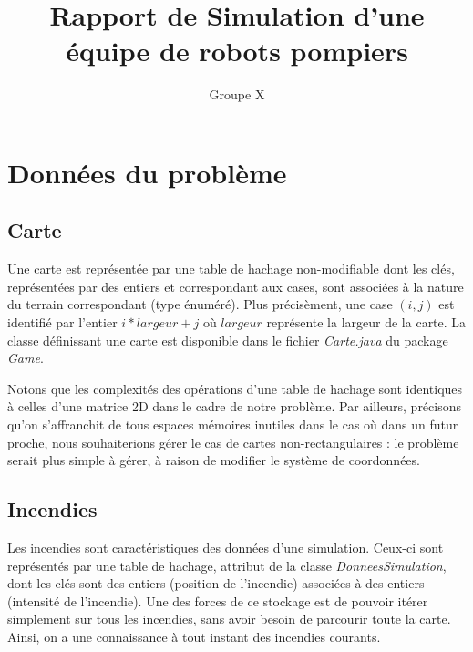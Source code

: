 \documentclass[a4paper, 10pt, french]{article}
\title{Rapport de Simulation d'une équipe de robots pompiers}
\author{Groupe X}
\begin{document}
\maketitle

\section{Données du problème}	

	\subsection{Carte}
	Une carte est représentée par une table de hachage non-modifiable dont les clés, représentées par des entiers et correspondant aux cases, sont associées à la nature du terrain correspondant (type énuméré). 
	Plus précisèment, une case $(i, j)$ est identifié par l'entier $i * largeur + j$ où $largeur$ représente la largeur de la carte. La classe définissant une carte est disponible dans le fichier {\it Carte.java} du package {\it Game}.
	\par\leavevmode\par
	Notons que les complexités des opérations d'une table de hachage sont identiques à celles d'une matrice 2D dans le cadre de notre problème. Par ailleurs, précisons qu'on s'affranchit de tous espaces mémoires inutiles dans le cas où dans un futur proche, nous souhaiterions gérer le cas de cartes non-rectangulaires : le problème serait plus simple à gérer, à raison de modifier le système de coordonnées.

	\subsection{Incendies}
	Les incendies sont caractéristiques des données d'une simulation. Ceux-ci sont représentés par une table de hachage, attribut de la classe {\it DonneesSimulation}, dont les clés sont des entiers (position de l'incendie) associées à des entiers (intensité de l'incendie). Une des forces de ce stockage est de pouvoir itérer simplement sur tous les incendies, sans avoir besoin de parcourir toute la carte. Ainsi, on a une connaissance à tout instant des incendies courants.
\end{document}
